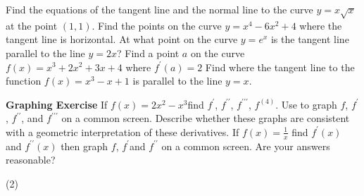\begin{Exercise}[title={Rate of Change},label=exRateOfChange]
\begin{Answer}[ref={exStandardDerivatives}]
\end{Answer}%

\begin{Exercise}[title={Maximums, Minimums, and Tangents},label=exMinMax]
\Question Find the equations of the	tangent line and the normal line to the curve $y =x \sqrt{x}$ at the point $(1 ,1)$. %
\Question Find the points on the curve $y =x^{4} -6 x^{2} +4$ where the tangent line is horizontal. %
\Question At what point on the curve $y =e^{x}$ is the tangent line parallel to the line $y =2 x$? %
\Question Find a point $a$ on the curve $f (x) =x^{3} +2 x^{2} +3 x +4$ where $f^{ \prime } (a) =2$ %
\Question Find where the tangent line to the function $f (x) =x^{3} -x +1$ is parallel to the line $y =x$.  %

\textbf{Graphing Exercise}
\Question If $f (x) =2 x^{2} -x^{3}$find $f^{ \prime }$, $f^{ \prime  \prime }$, $f^{ \prime  \prime  \prime }$, $f^{(4)}$. Use \Desmos to graph $f$, $f^{ \prime }$, $f^{ \prime  \prime }$, and $f^{ \prime  \prime  \prime }$ on a common screen. Describe whether these graphs are consistent with a geometric interpretation of these derivatives. %
\Question If $f (x) =\frac{1}{x}$ find $f^{ \prime } (x)$ and $f^{ \prime  \prime } (x)$ then graph $f$, $f^{ \prime }$and $f^{ \prime  \prime }$ on a common screen. Are your answers reasonable? %


	\Question 
	\begin{tasks}(2)
		\task  
		\task 
		\task 
		\task 
	\end{tasks}
	
	\Question 

\end{Exercise}
\begin{Answer}[ref={exMinMax}]
	
\end{Answer}%


\end{Exercise}
